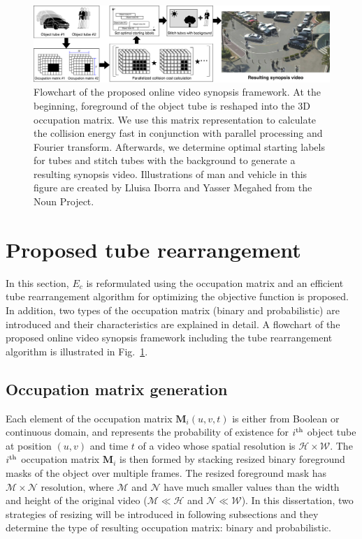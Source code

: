 \documentclass[11pt]{hyu_thesis}
\begin{document}
\begin{figure}
\includegraphics[width=\linewidth]{flowchart.pdf}
\caption{Flowchart of the proposed online video synopsis framework. At the beginning, foreground of the object tube is reshaped into the 3D occupation matrix. We use this matrix representation to calculate the collision energy fast in conjunction with parallel processing and Fourier transform. Afterwards, we determine optimal starting labels for tubes and stitch tubes with the background to generate a resulting synopsis video. Illustrations of man and vehicle in this figure are created by Lluisa Iborra and Yasser Megahed from the Noun Project.}
\label{fig:flowchart}
\end{figure}

\chapter{Proposed tube rearrangement}
\label{sec:proposed}
In this section, $E_c$ is reformulated using the occupation matrix and an efficient tube rearrangement algorithm for optimizing the objective function is proposed. In addition, two types of the occupation matrix (binary and probabilistic) are introduced and their characteristics are explained in detail. A flowchart of the proposed online video synopsis framework including the tube rearrangement algorithm is illustrated in Fig.~\ref{fig:flowchart}.

\section{Occupation matrix generation}
\label{sec:proposed:occ}
Each element of the occupation matrix $\textbf{M}_i (u,v,t)$ is either from Boolean or continuous domain, and represents the probability of existence for $i^{\rm{th}}$ object tube at position $(u,v)$ and time $t$ of a video whose spatial resolution is $\mathcal{H} \times \mathcal{W}$. The $i^{\rm{th}}$ occupation matrix $\textbf{M}_i$ is then formed by stacking resized binary foreground masks of the object over multiple frames. The resized foreground mask has $\mathcal{M} \times \mathcal{N}$ resolution, where $\mathcal{M}$ and $\mathcal{N}$ have much smaller values than the width and height of the original video ($\mathcal{M} \ll \mathcal{H}$ and $\mathcal{N} \ll \mathcal{W}$). In this dissertation, two strategies of resizing will be introduced in following subsections and they determine the type of resulting occupation matrix: binary and probabilistic.
\end{document}

